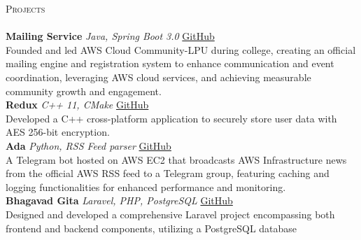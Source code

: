 \documentclass[a4paper]{article}
\newcommand{\lineunder} {
    \vspace*{-8pt} \\
    \hspace*{-18pt} \hrulefill \\
}
\newcommand{\header} [1] {
    {\hspace*{-18pt}\vspace*{6pt} \textsc{#1}}
    \vspace*{-6pt} \lineunder
}
\begin{document}
\header{Projects}
{\textbf{Mailing Service}} {\sl Java, Spring Boot 3.0} \hfill \href{https://github.com/AWS-Cloud-Community-LPU/mailing-service}{GitHub}\\
Founded and led AWS Cloud Community-LPU during college, creating an official mailing engine and registration system to enhance communication and event coordination, leveraging AWS cloud services, and achieving measurable community growth and engagement.\\
\vspace*{2mm}
{\textbf{Redux}} {\sl C++ 11, CMake} \hfill \href{https://github.com/garvit-joshi/Redux}{GitHub}\\
Developed a C++ cross-platform application to securely store user data with AES 256-bit encryption.\\
\vspace*{2mm}
{\textbf{Ada}} {\sl Python, RSS Feed parser} \hfill \href{https://github.com/AWS-Cloud-Community-LPU/Ada\_TelegramBot}{GitHub}\\
A Telegram bot hosted on AWS EC2 that broadcasts AWS Infrastructure news from the official AWS RSS feed to a Telegram group, featuring caching and logging functionalities for enhanced performance and monitoring.\\
\vspace*{2mm}
{\textbf{Bhagavad Gita}} {\sl Laravel, PHP, PostgreSQL} \hfill \href{https://github.com/garvit-joshi/Bhagavad-Gita}{GitHub}\\
Designed and developed a comprehensive Laravel project encompassing both frontend and backend components, utilizing a PostgreSQL database\\
\vspace*{2mm}



\ 
\end{document}
